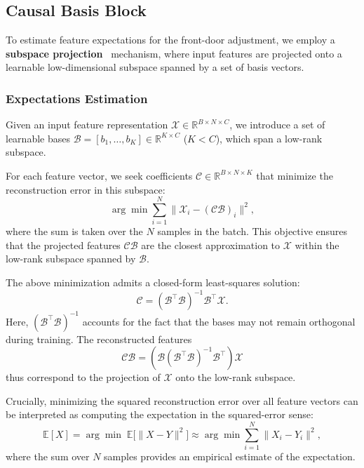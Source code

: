 \subsection{Causal Basis Block}
To estimate feature expectations for the front-door adjustment, we employ a \textbf{subspace projection}~\cite{strang2022introduction} mechanism,
where input features are projected onto a learnable low-dimensional subspace spanned by a set of basis vectors.
\subsubsection{Expectations Estimation} 
\label{sec:coefficients_estimation}
Given an input feature representation $\mathcal{X} \in \mathbb{R}^{B \times N \times C}$, 
we introduce a set of learnable bases
$\mathcal{B} = [b_1, \dots, b_K] \in \mathbb{R}^{K \times C}$ ($K < C$),
which span a low-rank subspace.

For each feature vector, we seek coefficients
$\mathcal{C} \in \mathbb{R}^{B \times N \times K}$
that minimize the reconstruction error in this subspace:
\begin{equation}
\arg\min \sum_{i=1}^{N} \| \mathcal{X}_i - (\mathcal{C} \mathcal{B})_i \|^2,
\end{equation}
where the sum is taken over the $N$ samples in the batch.
This objective ensures that the projected features $\mathcal{C} \mathcal{B}$
are the closest approximation to $\mathcal{X}$ within the low-rank subspace spanned by $\mathcal{B}$.

The above minimization admits a closed-form least-squares solution:
\begin{equation}
\mathcal{C} = (\mathcal{B}^\top \mathcal{B})^{-1} \mathcal{B}^\top \mathcal{X}.
\end{equation}
Here, $(\mathcal{B}^\top \mathcal{B})^{-1}$ accounts for the fact that the bases may not remain orthogonal during training.
The reconstructed features
\begin{equation}
\mathcal{C} \mathcal{B}
= (\mathcal{B} (\mathcal{B}^\top \mathcal{B})^{-1} \mathcal{B}^\top)\mathcal{X}
\end{equation}
thus correspond to the projection of $\mathcal{X}$ onto the low-rank subspace.

Crucially, minimizing the squared reconstruction error over all feature vectors
can be interpreted as computing the expectation in the squared-error sense:
\begin{equation}
\mathbb{E}[X] 
= \arg\min \; \mathbb{E}\big[\| X - Y \|^2\big]
\approx \arg\min \sum_{i=1}^{N} \| X_i - Y_i \|^2,
\end{equation}
where the sum over $N$ samples provides an empirical estimate of the expectation.


